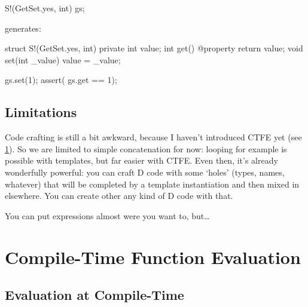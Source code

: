 \begin{dcode}
S!(GetSet.yes, int) gs;
\end{dcode}

generates:

\begin{dcode}
struct S!(GetSet.yes, int)
{
    private int value;
    int get() @property { return value;}
    void set(int _value) { value = _value;}
}
\end{dcode}

\begin{dcode}
gs.set(1);
assert( gs.get == 1);
\end{dcode}

\subsection{Limitations}\label{stringmixinslimitations}

Code crafting is still a bit awkward, because I haven't introduced CTFE yet (see \ref{ctfe}). So we are limited to simple concatenation for now: looping for example is possible with templates, but far easier with CTFE. Even then, it's already wonderfully powerful: you can craft D code with some `holes' (types, names, whatever) that will be completed by a template instantiation and then mixed in elsewhere. You can create other any kind of D code with that.

You can put \DD{()} expressions almost were you want to, but\ldots




\section{Compile-Time Function Evaluation} \label{ctfe}

\subsection{Evaluation at Compile-Time} \label{compiletimeevaluation}

